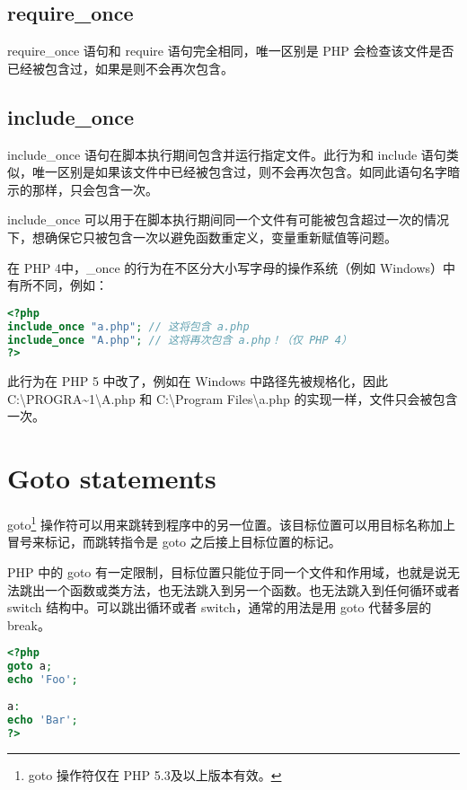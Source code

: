 \subsection{require\_once}

require\_once 语句和 require 语句完全相同，唯一区别是 PHP 会检查该文件是否已经被包含过，如果是则不会再次包含。

\subsection{include\_once}

include\_once 语句在脚本执行期间包含并运行指定文件。此行为和 include 语句类似，唯一区别是如果该文件中已经被包含过，则不会再次包含。如同此语句名字暗示的那样，只会包含一次。

include\_once 可以用于在脚本执行期间同一个文件有可能被包含超过一次的情况下，想确保它只被包含一次以避免函数重定义，变量重新赋值等问题。

在 PHP 4中，\_once 的行为在不区分大小写字母的操作系统（例如 Windows）中有所不同，例如：


\begin{lstlisting}[language=PHP]
<?php
include_once "a.php"; // 这将包含 a.php
include_once "A.php"; // 这将再次包含 a.php！（仅 PHP 4）
?>
\end{lstlisting}

此行为在 PHP 5 中改了，例如在 Windows 中路径先被规格化，因此 C:\textbackslash PROGRA\~{}1\textbackslash A.php 和 C:\textbackslash Program Files\textbackslash a.php 的实现一样，文件只会被包含一次。


\section{Goto statements}

goto\footnote{goto 操作符仅在 PHP 5.3及以上版本有效。} 操作符可以用来跳转到程序中的另一位置。该目标位置可以用目标名称加上冒号来标记，而跳转指令是 goto 之后接上目标位置的标记。

PHP 中的 goto 有一定限制，目标位置只能位于同一个文件和作用域，也就是说无法跳出一个函数或类方法，也无法跳入到另一个函数。也无法跳入到任何循环或者 switch 结构中。可以跳出循环或者 switch，通常的用法是用 goto 代替多层的 break。

\begin{lstlisting}[language=PHP]
<?php
goto a;
echo 'Foo';
 
a:
echo 'Bar';
?>
\end{lstlisting}

